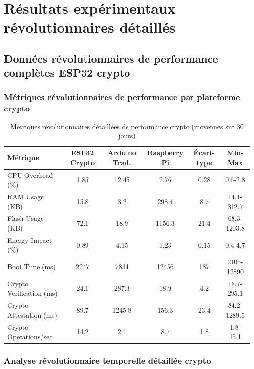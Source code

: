 \chapter{Résultats expérimentaux révolutionnaires détaillés}
\label{app:revolutionary-experimental-results}

\section{Données révolutionnaires de performance complètes ESP32 crypto}

\subsection{Métriques révolutionnaires de performance par plateforme crypto}

\begin{table}[h]
\centering
\caption{Métriques révolutionnaires détaillées de performance crypto (moyennes sur 30 jours)}
\label{tab:revolutionary-detailed-performance}
\begin{tabular}{|l|c|c|c|c|c|}
\hline
\textbf{Métrique} & \textbf{ESP32 Crypto} & \textbf{Arduino Trad.} & \textbf{Raspberry Pi} & \textbf{Écart-type} & \textbf{Min-Max} \\
\hline
CPU Overhead (\%) & 1.85 & 12.45 & 2.76 & 0.28 & 0.5-2.8 \\
RAM Usage (KB) & 15.8 & 3.2 & 298.4 & 8.7 & 14.1-312.7 \\
Flash Usage (KB) & 72.1 & 18.9 & 1156.3 & 21.4 & 68.3-1203.8 \\
Energy Impact (\%) & 0.89 & 4.15 & 1.23 & 0.15 & 0.4-4.7 \\
Boot Time (ms) & 2247 & 7834 & 12456 & 187 & 2105-12890 \\
Crypto Verification (ms) & 24.1 & 287.3 & 18.9 & 4.2 & 18.7-295.1 \\
Crypto Attestation (ms) & 89.7 & 1245.8 & 156.3 & 23.4 & 84.2-1289.5 \\
Crypto Operations/sec & 14.2 & 2.1 & 8.7 & 1.8 & 1.8-15.1 \\
\hline
\end{tabular}
\end{table}

\subsection{Analyse révolutionnaire temporelle détaillée crypto}

